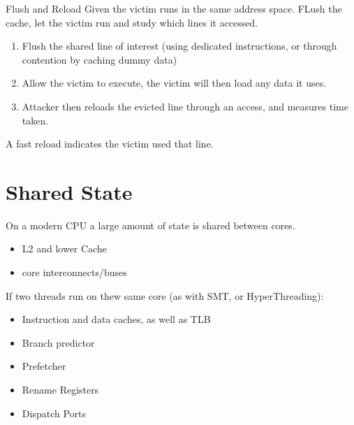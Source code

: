 \begin{definitionbox}{Flush and Reload}
	Given the victim runs in the same address space. FLush the cache, let the victim run and study which lines it accessed.
	\begin{enumerate}
		\item Flush the shared line of interest (using dedicated instructions, or through contention by caching dummy data)
		\item Allow the victim to execute, the victim will then load any data it uses.
		\item Attacker then reloads the evicted line through an access, and measures time taken.
	\end{enumerate}
	A fast reload indicates the victim used that line.
\end{definitionbox}

\section{Shared State}
On a modern CPU a large amount of state is shared between cores.
\begin{itemize}
	\item L2 and lower Cache
	\item core interconnects/buses
\end{itemize}
If two threads run on thew same core (as with SMT, or HyperThreading):
\begin{itemize}
	\item Instruction and data caches, as well as TLB
	\item Branch predictor
	\item Prefetcher
	\item Rename Registers
	\item Dispatch Ports
\end{itemize}

